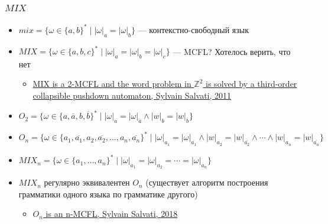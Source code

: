 \documentclass{beamer}
\begin{document}
\begin{frame}[fragile]

  \frametitle{$MIX$}
  \begin{itemize}
    \item $mix = \{\omega \in \{a,b\}^* \mid |\omega|_a = |\omega|_b \}$ --- контекстно-свободный язык

    \item $MIX = \{\omega \in \{a,b,c\}^* \mid |\omega|_a = |\omega|_b = |\omega|_c\}$ --- MCFL? Хотелось верить, что нет
    \begin{itemize}
      \item \href{https://hal.inria.fr/inria-00564552/document}{MIX is a 2-MCFL and the word problem in $\mathbb{Z}^2$ is solved by a third-order collapsible pushdown automaton, Sylvain Salvati, 2011}
    \end{itemize}
    \pause
    \item $O_2=\{\omega \in \{a,\overline{a},b,\overline{b}\}^* \mid |\omega|_a=|\omega|_{\overline{a}} \wedge |w|_b=|w|_{\overline{b}}\}$

    \item $O_n=\{\omega \in \{a_1,\overline{a_1},a_2,\overline{a_2},\ldots,a_n,\overline{a_n}\}^* \mid |\omega|_{a_1}=|\omega|_{\overline{a_1}} \wedge |w|_{a_2}=|w|_{\overline{a_2}} \wedge \cdots \wedge |w|_{a_n}=|w|_{\overline{a_n}}\}$
    \item $MIX_n = \{\omega \in \{a_1,\ldots,a_n\}^* \mid |\omega|_{a_1} = |\omega|_{a_2} =\cdots = |\omega|_{a_n}\}$
    \pause
    \item $MIX_n$ регулярно эквивалентен $O_n$ (существует алгоритм построения грамматики одного языка по грамматике другого)
    \begin{itemize}
      \item \href{https://hal.archives-ouvertes.fr/hal-01771670/document}{$O_n$ is an n-MCFL, Sylvain Salvati, 2018}
    \end{itemize}
  \end{itemize}
\end{frame}
\end{document}
